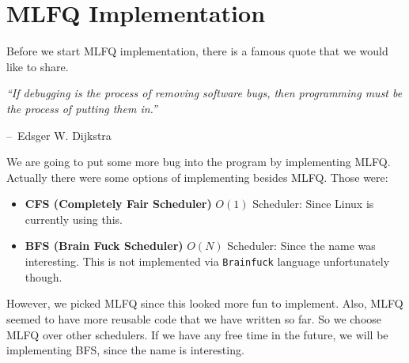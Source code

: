 \documentclass{homework}
\begin{document}
\section{MLFQ Implementation} 
Before we start MLFQ implementation, there is a famous quote that we would like to share.

\makeatletter
\newenvironment{chapquote}[2][2em]
  {\setlength{\@tempdima}{#1}%
   \def\chapquote@author{#2}%
   \parshape 1 \@tempdima \dimexpr\textwidth-2\@tempdima\relax%
   \itshape}
  {\par\normalfont\hfill--\ \chapquote@author\hspace*{\@tempdima}\par\bigskip}
\makeatother
\begin{chapquote}{Edsger W. Dijkstra}
``If debugging is the process of removing software bugs, then programming must be the process of putting them in.''
\end{chapquote}

We are going to put some more bug into the program by implementing MLFQ. Actually there were some options of implementing besides MLFQ. Those were:

\begin{itemize}
    \item \textbf{CFS (Completely Fair Scheduler)} $O(1)$ Scheduler: Since Linux is currently using this. 
    \item \textbf{BFS (Brain Fuck Scheduler)} $O(N)$ Scheduler: Since the name was interesting. This is not implemented via \texttt{Brainfuck} language unfortunately though. 
\end{itemize}
However, we picked MLFQ since this looked more fun to implement. Also, MLFQ seemed to have more reusable code that we have written so far. So we choose MLFQ over other schedulers. If we have any free time in the future, we will be implementing BFS, since the name is interesting. 
\end{document}

